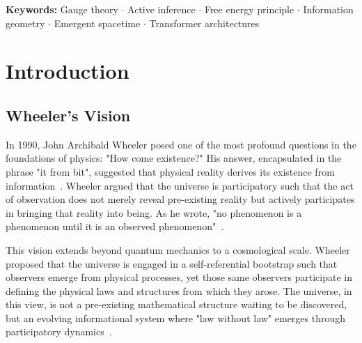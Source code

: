 \documentclass[11pt]{article}
\begin{document}
\begin{abstract}
Separately, we outline speculative extensions: a pullback information-geometric construction for cognitive reference frames in the Lahav-Neemeh sense (Section~\ref{sec:lahav_convergence}); a meta-agent renormalization scheme whose continuous variational criterion is not yet empirically validated against the discrete detector (Section~\ref{sec:meta_agent_threshold}); and a 2D linearized $\mathrm{GL}(K, \mathbb{C})$ worked example yielding an $\mathrm{SO}(1,1)$-compatible indefinite pullback metric under an imposed imaginary temporal generator and a real-part projection (Section~\ref{sec:signature_resolution}). The four-dimensional nonlinear extension, dynamical selection of the imaginary generator, dimensional analysis between informational and physical units, and a rigorous quantum extension are open; the gauge-orbit-averaged consensus metric used as the framework's candidate gauge-invariant geometry is also conditional on a regulator that we do not construct (Section~\ref{sec:consensus_metric}). We state these limitations explicitly in Section~\ref{sec:scope_limitations}.
\end{abstract}

\noindent\textbf{Keywords:} Gauge theory $\cdot$ Active inference $\cdot$ Free energy principle $\cdot$ Information geometry $\cdot$ Emergent spacetime $\cdot$ Transformer architectures

\section{Introduction}

\subsection{Wheeler's Vision}

In 1990, John Archibald Wheeler posed one of the most profound questions in the foundations of physics: "How come existence?" His answer, encapsulated in the phrase "it from bit", suggested that physical reality derives its existence from information~\cite{Wheeler1990}. Wheeler argued that the universe is participatory such that the act of observation does not merely reveal pre-existing reality but actively participates in bringing that reality into being. As he wrote, "no phenomenon is a phenomenon until it is an observed phenomenon"~\cite{Wheeler1983}.

This vision extends beyond quantum mechanics to a cosmological scale. Wheeler proposed that the universe is engaged in a self-referential bootstrap such that observers emerge from physical processes, yet those same observers participate in defining the physical laws and structures from which they arose. The universe, in this view, is not a pre-existing mathematical structure waiting to be discovered, but an evolving informational system where "law without law" emerges through participatory dynamics~\cite{Wheeler1983}.
\end{document}
